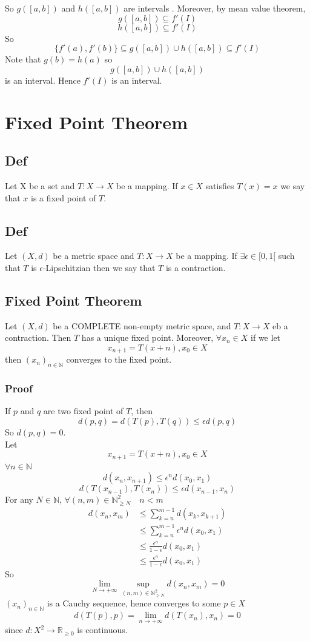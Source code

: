 \documentclass{book}
\begin{document}
So $g([a,b])$ and $h([a,b])$ are intervals . Moreover, by mean value theorem, $$g([a,b])\subseteq f'(I)$$$$h([a,b])\subseteq f'(I)$$
So $$\{f'(a),f'(b)\}\subseteq g([a,b])\cup h([a,b])\subseteq f'(I)$$
Note that $g(b)=h(a)$ so $$g([a,b])\cup h([a,b])$$ is an interval. Hence $f'(I)$ is an interval.
\chapter{Fixed Point Theorem}
\section{Def}
Let X be a set and $T: X\rightarrow X$ be a mapping. If $x\in X$ satisfies $T(x)=x$ we say that $x$ is a fixed point of $T$.
\section{Def}
Let $(X,d)$ be a metric space and $T:X\rightarrow X$ be a mapping. If $\exists \epsilon\in {[0,1[}$ such that $T$ is $\epsilon$-Lipschitzian then we say that $T$ is a contraction.
\section{Fixed Point Theorem}
Let $(X,d)$ be a COMPLETE non-empty metric space, and $T: X\rightarrow X$ eb a contraction. Then $T$ has a unique fixed point. Moreover, $\forall x_n\in X$ if we let $$x_{n+1}=T(x+n),x_0\in X$$ then $(x_n)_{n\in \mathbb{N}}$ converges to the fixed point.
\subsection*{Proof}
If $p$ and $q$ are two fixed point of $T$, then $$d(p,q)=d(T(p),T(q))\leq\epsilon d(p,q)$$So $d(p,q)=0$.\\
Let $$x_{n+1}=T(x+n),x_0\in X$$
$\forall n\in \mathbb{N}$$$d(x_n,x_{n+1})\leq\epsilon^nd(x_0,x_1)$$
$$d(T(x_{n-1}),T(x_n))\leq \epsilon d(x_{n-1},x_n)$$
For any $N\in \mathbb{N}$, $\forall (n,m)\in \mathbb{N}_{\geq N}^2\quad n<m$
$$\begin{aligned}
    d(x_n,x_m) &\leq \sum\limits_{k=n}^{m-1}d(x_k,x_{k+1})\\
    &\leq \sum\limits_{k=n}^{m-1}\epsilon^nd(x_0,x_1)\\
    &\leq \frac{\epsilon^n}{1-\epsilon}d(x_0,x_1)\\
    &\leq \frac{\epsilon^n}{1-\epsilon}d(x_0,x_1)
\end{aligned}$$
So $$\lim\limits_{N\rightarrow+\infty}\sup\limits_{(n,m)\in \mathbb{N}_{\geq N}^2}d(x_n,x_m)=0$$
$(x_n)_{n\in \mathbb{N}}$ is a Cauchy sequence, hence converges to some $p\in X$$$d(T(p),p)=\lim\limits_{n\rightarrow+\infty}d(T(x_n),x_n)=0$$
since $d:X^2\rightarrow \mathbb{R}_{\geq0}$ is continuous.
\end{document}
